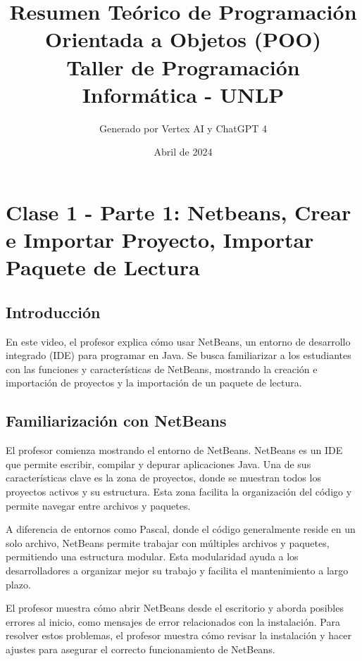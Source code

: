 \documentclass[a4paper]{report}
\title{\Huge  \textbf{Resumen Teórico de Programación Orientada a Objetos (POO)}\\[1cm] \huge Taller de Programación\\ Informática - UNLP\\[1cm]}
\author{\Large Generado por Vertex AI y ChatGPT 4}
\date{Abril de 2024}
\begin{document}
\maketitle
\tableofcontents
\newpage
\maketitle


\chapter{Clase 1 - Parte 1: Netbeans, Crear e Importar Proyecto, Importar Paquete de Lectura}
\section{Introducción}



En este video, el profesor explica cómo usar NetBeans, un entorno de desarrollo integrado (IDE) para programar en Java. Se busca familiarizar a los estudiantes con las funciones y características de NetBeans, mostrando la creación e importación de proyectos y la importación de un paquete de lectura.



\section{Familiarización con NetBeans}

El profesor comienza mostrando el entorno de NetBeans. NetBeans es un IDE que permite escribir, compilar y depurar aplicaciones Java. Una de sus características clave es la zona de proyectos, donde se muestran todos los proyectos activos y su estructura. Esta zona facilita la organización del código y permite navegar entre archivos y paquetes.



A diferencia de entornos como Pascal, donde el código generalmente reside en un solo archivo, NetBeans permite trabajar con múltiples archivos y paquetes, permitiendo una estructura modular. Esta modularidad ayuda a los desarrolladores a organizar mejor su trabajo y facilita el mantenimiento a largo plazo.



El profesor muestra cómo abrir NetBeans desde el escritorio y aborda posibles errores al inicio, como mensajes de error relacionados con la instalación. Para resolver estos problemas, el profesor muestra cómo revisar la instalación y hacer ajustes para asegurar el correcto funcionamiento de NetBeans.
\end{document}
